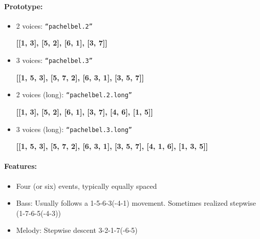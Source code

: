 \documentclass[11pt, openany]{article}
\begin{document}
\paragraph{Prototype:}
\begin{itemize}
\item 2 voices: \texttt{“pachelbel.2”}
	\begin{center}
	\textbf{[[1, 3], [5, 2], [6, 1], [3, 7]]}
	\end{center}
\item 3 voices: \texttt{“pachelbel.3”}
	\begin{center}
	\textbf{[[1, 5, 3], [5, 7, 2], [6, 3, 1], [3, 5, 7]]}
	\end{center}
\item 2 voices (long): \texttt{“pachelbel.2.long”}
	\begin{center}
	\textbf{[[1, 3], [5, 2], [6, 1], [3, 7], [4, 6], [1, 5]]}
	\end{center}
\item 3 voices (long): \texttt{“pachelbel.3.long”}
	\begin{center}
	\textbf{[[1, 5, 3], [5, 7, 2], [6, 3, 1], [3, 5, 7], [4, 1, 6], [1, 3, 5]]}
	\end{center}
\end{itemize}

\paragraph{Features:}
\begin{itemize}
\item Four (or six) events, typically equally spaced
\item Bass: Usually follows a 1-5-6-3(-4-1) movement. Sometimes realized stepwise (1-7-6-5(-4-3))
\item Melody: Stepwise descent 3-2-1-7(-6-5)
\end{itemize}
\end{document}
